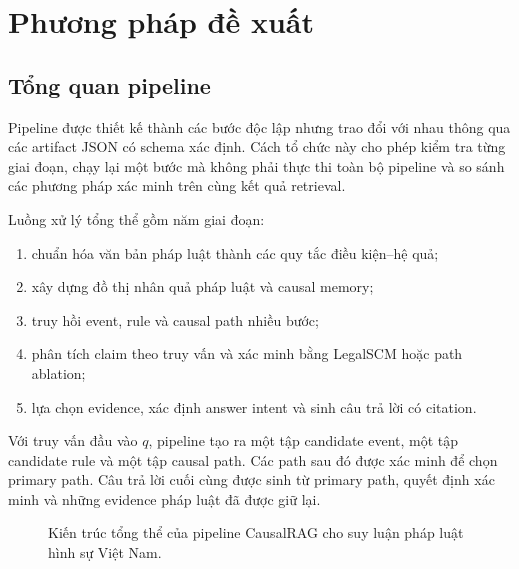 \section{Phương pháp đề xuất}
\label{sec:method}

\subsection{Tổng quan pipeline}

Pipeline được thiết kế thành các bước độc lập nhưng trao đổi với nhau thông
qua các artifact JSON có schema xác định. Cách tổ chức này cho phép kiểm tra
từng giai đoạn, chạy lại một bước mà không phải thực thi toàn bộ pipeline và
so sánh các phương pháp xác minh trên cùng kết quả retrieval.

Luồng xử lý tổng thể gồm năm giai đoạn:

\begin{enumerate}
    \item chuẩn hóa văn bản pháp luật thành các quy tắc điều
    kiện--hệ quả;

    \item xây dựng đồ thị nhân quả pháp luật và causal memory;

    \item truy hồi event, rule và causal path nhiều bước;

    \item phân tích claim theo truy vấn và xác minh bằng LegalSCM hoặc path
    ablation;

    \item lựa chọn evidence, xác định answer intent và sinh câu trả lời có
    citation.
\end{enumerate}

Với truy vấn đầu vào \(q\), pipeline tạo ra một tập candidate event, một tập
candidate rule và một tập causal path. Các path sau đó được xác minh để chọn
primary path. Câu trả lời cuối cùng được sinh từ primary path, quyết định
xác minh và những evidence pháp luật đã được giữ lại.

\begin{figure}[t]
    \centering
    \caption{Kiến trúc tổng thể của pipeline CausalRAG cho suy luận pháp
    luật hình sự Việt Nam.}
    \label{fig:pipeline}
\end{figure}

